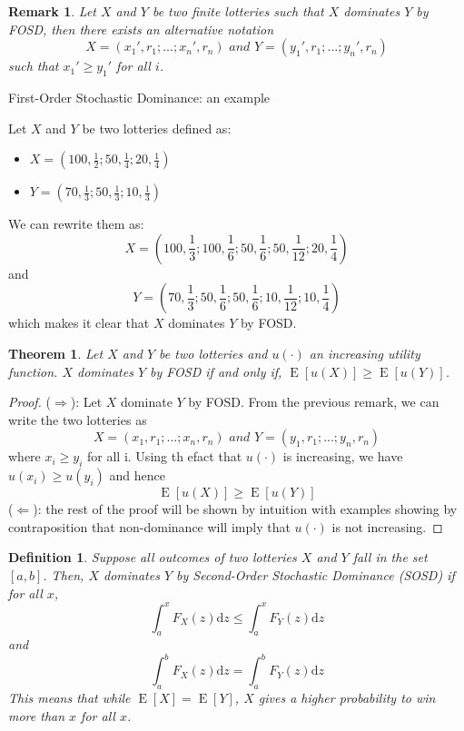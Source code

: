 \documentclass[12pt]{report}
\newtheorem{theorem}{Theorem}[chapter]
\newtheorem{definition}{Definition}[chapter]
\newtheorem{remark}{Remark}[chapter]
\newcommand{\E}[1]{\operatorname{E}\left[#1\right]}
\def\D{\mathrm{d}}
\begin{document}
\begin{remark}
Let $X$ and $Y$ be two finite lotteries such that $X$ dominates $Y$ by FOSD, then there exists an alternative notation $$ X = (x_1', r_1; ...; x_n', r_n) \textit{ and }Y = (y_1', r_1; ...; y_n', r_n)$$ such that $x_1' \geq y_1'$ for all $i$.
\end{remark}

\begin{bclogo}[couleur=blue!10, arrondi=0.1, logo=,ombre=false]{ First-Order Stochastic Dominance: an example} 
\begin{small}
Let $X$ and $Y$ be two lotteries defined as: \begin{itemize}
\item $X = \left(100, \frac{1}{2}; 50, \frac{1}{4} ; 20, \frac{1}{4}\right)$
\item $Y = \left(70, \frac{1}{3};50, \frac{1}{3}; 10, \frac{1}{3}\right)$
\end{itemize}
We can rewrite them as: $$X = \left(100, \frac{1}{3}; 100, \frac{1}{6}; 50, \frac{1}{6} ; 50, \frac{1}{12} ; 20, \frac{1}{4}\right)$$ and 
$$ Y = \left(70, \frac{1}{3};50, \frac{1}{6};50, \frac{1}{6}; 10, \frac{1}{12}; 10, \frac{1}{4}\right)$$ which makes it clear that $X$ dominates $Y$ by FOSD.
\end{small}
\end{bclogo}

\begin{theorem}
Let $X$ and $Y$ be two lotteries and $u(\cdot)$ an increasing utility function. $X$ dominates $Y$ by FOSD if and only if, $\E{u(X)} \geq	\E{u(Y)}$.
\end{theorem}

\begin{proof}
($\Rightarrow$): Let $X$ dominate $Y$ by FOSD. From the previous remark, we can write the two lotteries as $$X=(x_1, r_1; ...; x_n, r_n) \textit{ and } Y = (y_1, r_1; ...; y_n, r_n) $$ where $x_i \geq y_i$ for all i. Using th efact that $u(\cdot)$ is increasing, we have $u(x_i)\geq u(y_i)$ and hence $$\E{u(X)} \geq \E{u(Y)}$$ ($\Leftarrow$): the rest of the proof will be shown by intuition with examples showing by contraposition that non-dominance will imply that $u(\cdot)$ is not increasing.
\end{proof}

\begin{definition}
Suppose all outcomes of two lotteries $X$ and $Y$ fall in the set $\left[a, b\right]$. Then, $X$ dominates $Y$ by Second-Order Stochastic Dominance (SOSD) if for all $x$, $$\int_a^x F_X(z)\D z \leq \int_a^x F_Y(z)\D z $$ and $$\int_a^b F_X(z)\D z = \int_a^b F_Y(z)\D z $$ This means that while $\E{X} = \E{Y}$, $X$ gives a higher probability to win more than $x$ for all $x$.
\end{definition}
\end{document}
